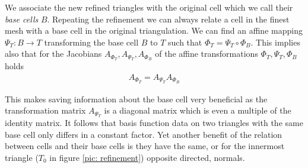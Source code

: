 We associate the new refined triangles with the original cell which we call their \emph{base cells} $B$. Repeating the refinement we can always relate a cell in the finest mesh with a base cell in the original triangulation. We can find an affine mapping $\Psi_T:B \rightarrow T$ transforming the base cell $B$ to $T$ such that $\Phi_T = \Psi_T \circ \Phi_B$. This implies also that for the Jacobians $A_{\Phi_T}, A_{\Psi_T}, A_{\Phi_B}$ of the affine transformations $\Phi_T, \Psi_T,\Phi_B$ holds
\begin{align}
A_{\Phi_T}=A_{\Psi_T} A_{\Phi_B}
\end{align} 

This makes saving information about the base cell very beneficial as the transformation matrix $A_{\Psi_T}$ is a diagonal matrix which is even a multiple of the identity matrix. It follows that basis function data on two triangles with the same base cell only differs in a constant factor. Yet another benefit of the relation between cells and their base cells is they have the same, or for the innermost triangle ($T_0$ in figure \ref{pic: refinement}) opposite directed, normals.

